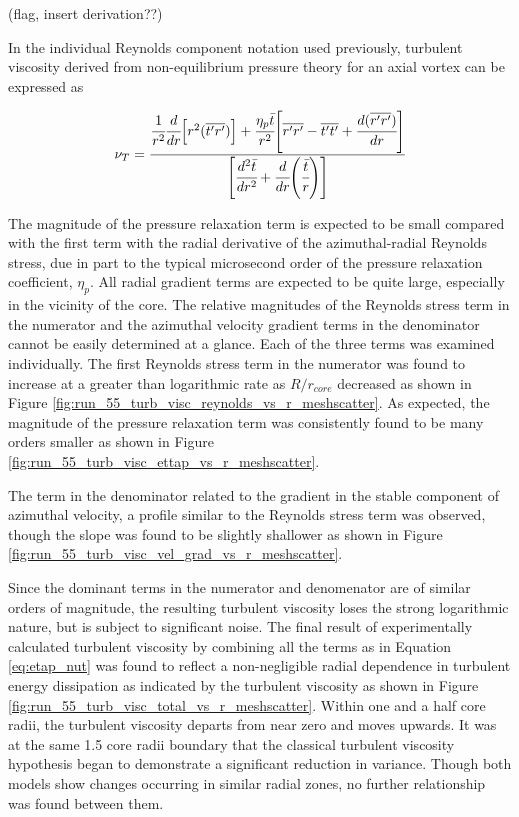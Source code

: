 (flag, insert derivation??)

In the individual Reynolds component notation used previously, turbulent 
viscosity derived from non-equilibrium pressure theory for an axial vortex can 
be expressed as

\begin{equation}
\nu_T =
    \cfrac{\cfrac{1}{r^2}\cfrac{d}{dr}\Big[r^2 (\overline{t^\prime 
    r^\prime})\Big] +
	\cfrac{\eta_p \bar{t}}{r^2}\Bigg[\overline{r^\prime r^\prime} - 
	\overline{t^\prime 	t^\prime} + \cfrac{d(\overline{r^\prime 
	r^\prime})}{dr}\Bigg]} {\Bigg[\cfrac{d^2 \bar{t}}{dr^2} + \cfrac{d}{dr}
	\Bigg(\cfrac{\bar{t}}{r}\Bigg)\Bigg]}
\label{eq:etap_nut}
\end{equation}

\noindent
The magnitude of the pressure relaxation term is expected to be small compared 
with the first term with the radial derivative of the azimuthal-radial Reynolds 
stress, due in part to the typical microsecond order of the pressure relaxation 
coefficient, $\eta_p$. All radial gradient terms are expected to be quite 
large, especially in the vicinity of the core. The relative magnitudes of the 
Reynolds stress term in the numerator and the azimuthal velocity gradient terms 
in the denominator cannot be easily determined at a glance. Each of the three 
terms was examined individually. The first Reynolds stress term in the 
numerator was found to increase at a greater than logarithmic rate as 
$R/r_{core}$ decreased as shown in Figure 
\ref{fig:run_55_turb_visc_reynolds_vs_r_meshscatter}. As expected, the 
magnitude of the pressure relaxation term was consistently found to be many 
orders smaller as shown in Figure 
\ref{fig:run_55_turb_visc_ettap_vs_r_meshscatter}.




The term in the denominator related to the gradient in the stable component of 
azimuthal velocity, a profile similar to the Reynolds stress term was observed, 
though the slope was found to be slightly shallower as shown in Figure 
\ref{fig:run_55_turb_visc_vel_grad_vs_r_meshscatter}.



Since the dominant terms in the numerator and denomenator are of similar orders 
of magnitude, the resulting turbulent viscosity loses the strong logarithmic 
nature, but is subject to significant noise. The final result of experimentally 
calculated turbulent viscosity by combining all the terms as in Equation 
\ref{eq:etap_nut} was found to reflect a non-negligible radial dependence in 
turbulent energy dissipation as indicated by the turbulent viscosity as shown 
in Figure \ref{fig:run_55_turb_visc_total_vs_r_meshscatter}. Within one and a 
half core radii, the turbulent viscosity departs from near zero and moves 
upwards. It was at the same 1.5 core radii boundary that the classical 
turbulent viscosity hypothesis began to demonstrate a significant reduction in 
variance. Though both models show changes occurring in similar radial zones, no 
further relationship was found between them.

